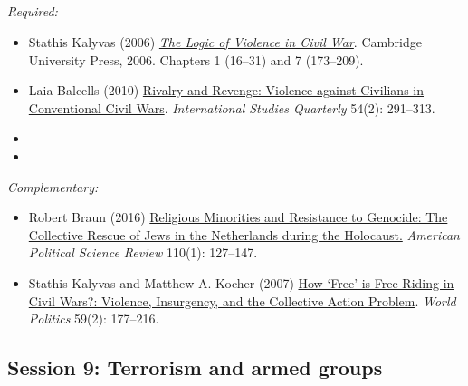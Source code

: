 \documentclass[12pt, a4paper]{article}
\begin{document}
\vspace{20pt}
\hline
\subsection*{{\color{red}{Session 8: Wartime violence}}}

\noindent\textit{Required:}

\begin{itemize}
  \item Stathis Kalyvas (2006) \href{https://bibliotecas.uc3m.es/permalink/f/1nggclj/34UC3M_ALMA21161986050004213}{\textit{The Logic of Violence in Civil War}}. Cambridge University Press, 2006. Chapters 1 (16--31) and 7 (173--209).
  \item Laia Balcells (2010) \href{https://doi.org/10.1111/j.1468-2478.2010.00588.x}{Rivalry and Revenge: Violence against Civilians in Conventional Civil Wars}. \textit{International Studies Quarterly} 54(2): 291--313.
  \item {\color{red}{Weidmann, N. B. (2011). Violence “from above” or “from below”? The Role of Ethnicity in Bosnia’s Civil War. The Journal of Politics, 73(04), 1178-1190.}}
  \item {\color{red}{Cohen, D. K. (2013). Explaining rape during civil war: Cross-national evidence (1980– 2009). American Political Science Review, 107(03), 461-477.}}
\end{itemize}

\noindent\textit{Complementary:}

\begin{itemize}
  \item Robert Braun (2016) \href{https://doi.org/10.1017/S0003055415000544}{Religious Minorities and Resistance to Genocide: The Collective Rescue of Jews in the Netherlands during the Holocaust.} \textit{American Political Science Review} 110(1): 127--147.
  \item Stathis Kalyvas and Matthew A. Kocher (2007) \href{https://doi.org/10.1353/wp.2007.0023}{How `Free' is Free Riding in Civil Wars?: Violence, Insurgency, and the Collective Action Problem}. \textit{World Politics} 59(2): 177--216.
\end{itemize}

\vspace{20pt}
\hline
\subsection*{Session 9: Terrorism and armed groups}
\end{document}

